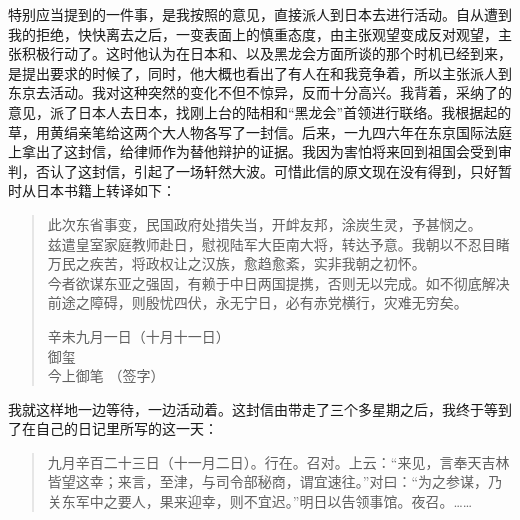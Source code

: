 特别应当提到的一件事，是我按照的意见，直接派人到日本去进行活动。自从遭到我的拒绝，快快离去之后，一变表面上的慎重态度，由主张观望变成反对观望，主张积极行动了。这时他认为在日本和、以及黑龙会方面所谈的那个时机已经到来，是提出要求的时候了，同时，他大概也看出了有人在和我竞争着，所以主张派人到东京去活动。我对这种突然的变化不但不惊异，反而十分高兴。我背着，采纳了的意见，派了日本人去日本，找刚上台的陆相和“黑龙会”首领进行联络。我根据起的草，用黄绢亲笔给这两个大人物各写了一封信。后来，一九四六年在东京国际法庭上拿出了这封信，给律师作为替他辩护的证据。我因为害怕将来回到祖国会受到审判，否认了这封信，引起了一场轩然大波。可惜此信的原文现在没有得到，只好暂时从日本书籍上转译如下：\\

\begin{quote}
	此次东省事变，民国政府处措失当，开衅友邦，涂炭生灵，予甚悯之。\\

兹遣皇室家庭教师赴日，慰视陆军大臣南大将，转达予意。我朝以不忍目睹万民之疾苦，将政权让之汉族，愈趋愈紊，实非我朝之初怀。\\

今者欲谋东亚之强固，有赖于中日两国提携，否则无以完成。如不彻底解决前途之障碍，则殷忧四伏，永无宁日，必有赤党横行，灾难无穷矣。\\

\begin{flushright}
	辛未九月一日（十月十一日）\\

御玺\\

今上御笔       （签字）\\
\end{flushright}
\end{quote}

我就这样地一边等待，一边活动着。这封信由带走了三个多星期之后，我终于等到了在自己的日记里所写的这一天：\\

\begin{quote}
	九月辛百二十三日（十一月二日）。行在。召对。上云：“来见，言奉天吉林皆望这幸；来言，至津，与司令部秘商，谓宜速往。”对曰：“为之参谋，乃关东军中之要人，果来迎幸，则不宜迟。”明日以告领事馆。夜召。……\\
\end{quote}
